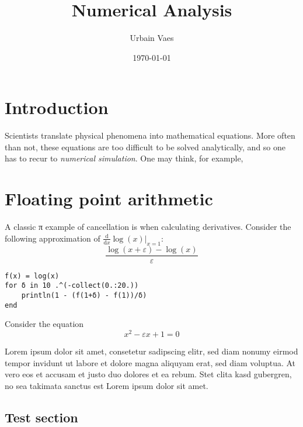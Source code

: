 \documentclass[a4paper]{report}
\title{Numerical Analysis}
\author{Urbain Vaes}
\date{\today}
\renewcommand{\d}{\mathrm d}
\begin{document}
\maketitle

\tableofcontents

\chapter*{Introduction}%
Scientists translate physical phenomena into mathematical equations.
More often than not,
these equations are too difficult to be solved analytically,
and so one has to recur to \emph{numerical simulation}.
One may think, for example,

\chapter{Floating point arithmetic}%
\label{cha:rounding_errors}

\begin{example}
\end{example}

\begin{example}
    A classic π example of cancellation is when calculating derivatives.
    Consider the following approximation of $\frac{\d}{\d x}\log(x) \vert_{x=1}$:
    \[
        	\frac{\log(x + \varepsilon) - \log(x)}{\varepsilon}
    \]
\begin{verbatim}
f(x) = log(x)
for δ in 10 .^(-collect(0.:20.))
    println(1 - (f(1+δ) - f(1))/δ)
end
\end{verbatim}
\end{example}

\begin{example}
    Consider the equation
    \[
        x^2 - \varepsilon x + 1 = 0
    \]
\end{example}

Lorem ipsum dolor sit amet, consetetur sadipscing elitr, sed diam nonumy eirmod tempor invidunt ut labore et dolore magna aliquyam erat, sed diam voluptua. At vero eos et accusam et justo duo dolores et ea rebum. Stet clita kasd gubergren, no sea takimata sanctus est Lorem ipsum dolor sit amet.

\section{Test section}%
\label{sec:test_section}
\end{document}
